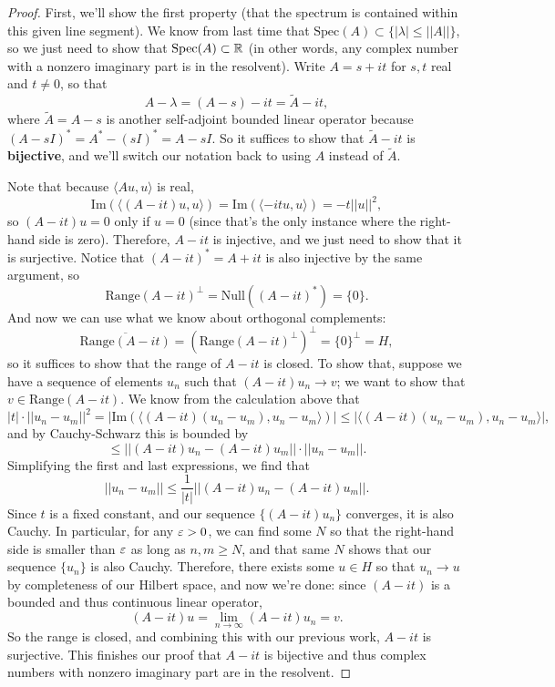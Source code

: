 \begin{proof}
First, we'll show the first property (that the spectrum is contained within this given line segment). We know from last time that $\text{Spec}(A) \subset \{|\lambda| \le ||A||\}$, so we just need to show that $\text{Spec}(A) \subset \mathbb R$ (in other words, any complex number with a nonzero imaginary part is in the resolvent). Write $A = s + it$ for $s, t$ real and $t \ne 0$, so that 
\[
    A - \lambda = (A - s) - it = \tilde{A} - it,
\]
where $\tilde{A} = A-s$ is another self-adjoint bounded linear operator because $(A-sI)^\ast = A^\ast - (sI)^\ast = A - sI$. So it suffices to show that $\tilde{A} - it$ is \textbf{bijective}, and we'll switch our notation back to using $A$ instead of $\tilde{A}$. 

Note that because $\langle Au, u \rangle$ is real, 
\[
    \text{Im}(\langle(A-it)u, u \rangle) = \text{Im}(\langle-itu, u \rangle) = -t ||u||^2,
\]
so $(A - it)u = 0$ only if $u = 0$ (since that's the only instance where the right-hand side is zero). Therefore, $A-it$ is injective, and we just need to show that it is surjective. Notice that $(A - it)^\ast = A+it$ is also injective by the same argument, so 
\[
    \text{Range}(A-it)^\perp = \text{Null}((A-it)^\ast) = \{0\}.
\]
And now we can use what we know about orthogonal complements: 
\[
    \overline{\text{Range}(A-it)} = (\text{Range}(A-it)^\perp)^\perp = \{0\}^\perp = H,
\]
so it suffices to show that the range of $A-it$ is closed. To show that, suppose we have a sequence of elements $u_n$ such that $(A-it)u_n \to v$; we want to show that $v \in \text{Range}(A-it)$. We know from the calculation above that
\[
    |t| \cdot ||u_n - u_m||^2 = |\text{Im}(\langle(A-it)(u_n - u_m), u_n-u_m\rangle)| \le |\langle(A-it)(u_n - u_m), u_n-u_m\rangle|,
\]
and by Cauchy-Schwarz this is bounded by
\[
    \le ||(A-it)u_n - (A-it)u_m|| \cdot ||u_n-u_m||.
\]
Simplifying the first and last expressions, we find that
\[
    ||u_n - u_m|| \le \frac{1}{|t|}||(A-it)u_n - (A-it)u_m||.
\]
Since $t$ is a fixed constant, and our sequence $\{(A-it)u_n\}$ converges, it is also Cauchy. In particular, for any $\varepsilon > 0$, we can find some $N$ so that the right-hand side is smaller than $\varepsilon$ as long as $n, m \ge N$, and that same $N$ shows that our sequence $\{u_n\}$ is also Cauchy. Therefore, there exists some $u \in H$ so that $u_n \to u$ by completeness of our Hilbert space, and now we're done: since $(A-it)$ is a bounded and thus continuous linear operator, 
\[
    (A-it)u = \lim_{n \to \infty} (A-it)u_n = v.
\]
So the range is closed, and combining this with our previous work, $A-it$ is surjective. This finishes our proof that $A-it$ is bijective and thus complex numbers with nonzero imaginary part are in the resolvent.


\end{proof}
